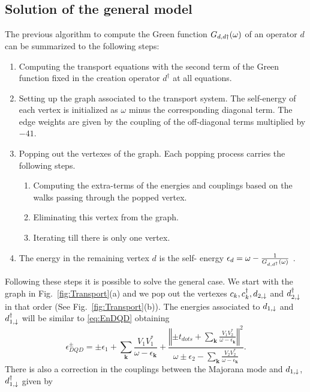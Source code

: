 \documentclass[showpacs,aps,prb,reprint,superscriptaddress]{revtex4-1}
\begin{document}
\subsection{Solution of the general model}

The previous algorithm  to compute the Green function  $G_{d,d\dagger}(\omega)$ of an operator $d$ can be summarized to the following steps:

\begin{enumerate}
    \item Computing the transport equations with the second term of the Green function fixed in the creation operator $d^\dagger$ at all equations. 
     \item  Setting up the  graph associated to the transport system. The self-energy of each vertex is initialized as $\omega$ minus the corresponding diagonal term.  The edge weights are given by the coupling of the off-diagonal terms multiplied by $-41$. 
    \item Popping out the vertexes of the graph. Each popping process carries the following steps.
    \begin{enumerate}
        \item Computing the extra-terms of the energies and couplings based on the walks passing through the popped vertex.
        \item Eliminating this vertex from the graph. 
        \item Iterating till there is only one  vertex.
        \end{enumerate}
    \item The energy in the remaining vertex $d$ is the self- energy $\epsilon_d = \omega -\frac{1}{ G_{d,d^\dagger}(\omega)}$ .
\end{enumerate}
  


Following these steps it is possible to solve the general case.  We start with the graph in Fig.\ \ref{fig:Transport}(a) and we pop out the vertexes $c_k,c^\dagger_k, d_{2,\downarrow}$ and $ d^\dagger_{2,\downarrow}$ in that order (See Fig.\ \ref{fig:Transport}(b)). The energies associated to $d_{1,\downarrow}$ and $d^\dagger_{1,\downarrow}$ will be similar to \eqref{eq:EnDQD} obtaining
\begin{equation}
    \epsilon_{DQD}^{\pm}=\pm\epsilon_{1}+\sum_{\mathbf{k}}\frac{V_{1}V_{1}^{*}}{\omega-\epsilon_{\mathbf{k}}}+\frac{\left\Vert \pm t_{dots}+\sum_{\mathbf{k}}\frac{V_{1}V_{2}^{*}}{\omega-\epsilon_{\mathbf{k}}}\right\Vert ^{2}}{\omega\pm\epsilon_{2}-\sum_{\mathbf{k}}\frac{V_{2}V_{2}^{*}}{\omega-\epsilon_{\mathbf{k}}}}. \label{eq:epDQD+-}
\end{equation}
\noindent There is also a correction in the couplings between the Majorana mode and $d_{1,\downarrow}$, $d^\dagger_{1,\downarrow}$ given by 
\end{document}
